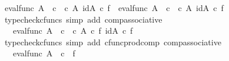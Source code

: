 \begin{isabellebody}
\ {\isachardoublequoteopen}{\isacharparenleft}{\kern0pt}eval{\isacharunderscore}{\kern0pt}func\ A\ {\isasymOmega}\ {\isasymcirc}\isactrlsub c\ {\isasymlangle}{\isasymt}\ {\isasymcirc}\isactrlsub c\ {\isasymbeta}\isactrlbsub A\isactrlbsup {\isasymOmega}\isactrlesup \isactrlesub {\isacharcomma}{\kern0pt}\ id{\isacharparenleft}{\kern0pt}A\isactrlbsup {\isasymOmega}\isactrlesup {\isacharparenright}{\kern0pt}{\isasymrangle}{\isacharparenright}{\kern0pt}\ {\isasymcirc}\isactrlsub c\ f\ {\isacharequal}{\kern0pt}\ eval{\isacharunderscore}{\kern0pt}func\ A\ {\isasymOmega}\ {\isasymcirc}\isactrlsub c\ {\isasymlangle}{\isasymt}\ {\isasymcirc}\isactrlsub c\ {\isasymbeta}\isactrlbsub A\isactrlbsup {\isasymOmega}\isactrlesup \isactrlesub {\isacharcomma}{\kern0pt}\ id{\isacharparenleft}{\kern0pt}A\isactrlbsup {\isasymOmega}\isactrlesup {\isacharparenright}{\kern0pt}{\isasymrangle}\ {\isasymcirc}\isactrlsub c\ f{\isachardoublequoteclose}\isanewline
\ \ \ \ \ \ \ \ \ \isamarkupfalse%
\ {\isacharparenleft}{\kern0pt}typecheck{\isacharunderscore}{\kern0pt}cfuncs{\isacharcomma}{\kern0pt}\ simp\ add{\isacharcolon}{\kern0pt}\ comp{\isacharunderscore}{\kern0pt}associative{}{\isacharparenright}{\kern0pt}\isanewline
\ \ \ \ \ \ \ \isamarkupfalse%
\ \isamarkupfalse%
\ {\isachardoublequoteopen}{\isachardot}{\kern0pt}{\isachardot}{\kern0pt}{\isachardot}{\kern0pt}\ {\isacharequal}{\kern0pt}\ eval{\isacharunderscore}{\kern0pt}func\ A\ {\isasymOmega}\ {\isasymcirc}\isactrlsub c\ {\isasymlangle}{\isasymt}\ {\isasymcirc}\isactrlsub c\ {\isasymbeta}\isactrlbsub A\isactrlbsup {\isasymOmega}\isactrlesup \isactrlesub \ {\isasymcirc}\isactrlsub c\ f{\isacharcomma}{\kern0pt}\ id{\isacharparenleft}{\kern0pt}A\isactrlbsup {\isasymOmega}\isactrlesup {\isacharparenright}{\kern0pt}\ {\isasymcirc}\isactrlsub c\ f{\isasymrangle}{\isachardoublequoteclose}\isanewline
\ \ \ \ \ \ \ \ \ \isamarkupfalse%
\ {\isacharparenleft}{\kern0pt}typecheck{\isacharunderscore}{\kern0pt}cfuncs{\isacharcomma}{\kern0pt}\ simp\ add{\isacharcolon}{\kern0pt}\ cfunc{\isacharunderscore}{\kern0pt}prod{\isacharunderscore}{\kern0pt}comp\ comp{\isacharunderscore}{\kern0pt}associative{}{\isacharparenright}{\kern0pt}\isanewline
\ \ \ \ \ \ \ \isamarkupfalse%
\ \isamarkupfalse%
\ {\isachardoublequoteopen}{\isachardot}{\kern0pt}{\isachardot}{\kern0pt}{\isachardot}{\kern0pt}\ {\isacharequal}{\kern0pt}\ eval{\isacharunderscore}{\kern0pt}func\ A\ {\isasymOmega}\ {\isasymcirc}\isactrlsub c\ {\isasymlangle}{\isasymt}{\isacharcomma}{\kern0pt}\ f{\isasymrangle}{\isachardoublequoteclose}\isanewline

\end{isabellebody}
